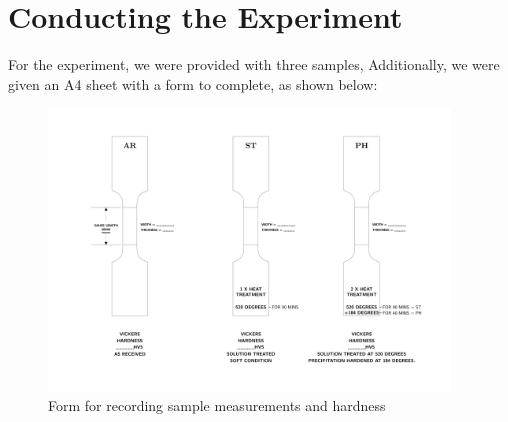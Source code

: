 \documentclass{article}
\begin{document}
\section{Conducting the Experiment}
For the experiment, we were provided with three samples, Additionally, we were given an A4 sheet with a form to complete, as shown below:
\begin{figure}[H] 
    \centering 
    \includegraphics[width=0.95\textwidth,cfbox=gray!22 1pt]{figures/alloys_base.jpg} %
    \caption{Form for recording sample measurements and hardness} 
    \label{fig:alloys} 
\end{figure}
\end{document}
